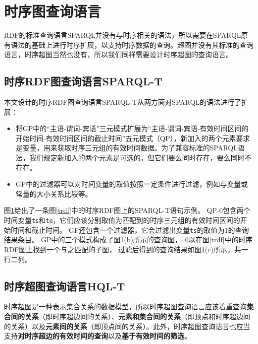 \section{时序图查询语言}
RDF的标准查询语言SPARQL并没有与时序相关的语法，所以需要在SPARQL原有语法的基础上进行时序扩展，以支持时序数据的查询。超图并没有其标准的查询语言，时序超图当然也没有，所以我们同样需要设计时序超图的查询语言。

\subsection{时序RDF图查询语言SPARQL-T}
本文设计的时序RDF图查询语言SPARQL-T从两方面对SPARQL的语法进行了扩展：
\begin{itemize}
\item 将GP中的“主语-谓词-宾语”三元模式扩展为“主语-谓词-宾语-有效时间区间的开始时间-有效时间区间的截止时间”五元模式（QP），新加入的两个元素要求是变量，用来获取时序三元组的有效时间数据。为了兼容标准的SPARQL语法，我们规定新加入的两个元素是可选的，但它们要么同时存在，要么同时不存在。
\item GP中的过滤器可以对时间变量的取值按照一定条件进行过滤，例如与变量或常量的大小关系比较等。
\end{itemize}

\begin{figure}[!htb]
\label{tsparql}
\end{figure}

图\ref{tsparql}给出了一条图\ref{trdf}中的时序RDF图上的SPARQL-T语句示例。
QP-0包含两个时间变量\texttt{ts}和\texttt{te}，它们应该分别取值为匹配到的时序三元组的有效时间区间的开始时间和截止时间。
GP还包含一个过滤器，它会过滤出变量\texttt{ts}的取值为1的查询结果条目。
GP中的三个模式构成了图\ref{tsparql}(b)所示的查询图，可以在图\ref{trdf}中的时序RDF图上找到一个与之匹配的子图，
过滤后得到的查询结果如图\ref{tsparql}(c)所示，共一行二列。

\subsection{时序超图查询语言HQL-T}
时序超图是一种表示集合关系的数据模型，所以时序超图查询语言应该着重查询\textbf{集合间的关系}（即时序超边间的关系）、\textbf{元素和集合间的关系}（即顶点和时序超边间的关系）以及\textbf{元素间的关系}（即顶点间的关系）。此外，时序超图查询语言也应当支持\textbf{对时序超边的有效时间的查询}以及\textbf{基于有效时间的筛选}。

